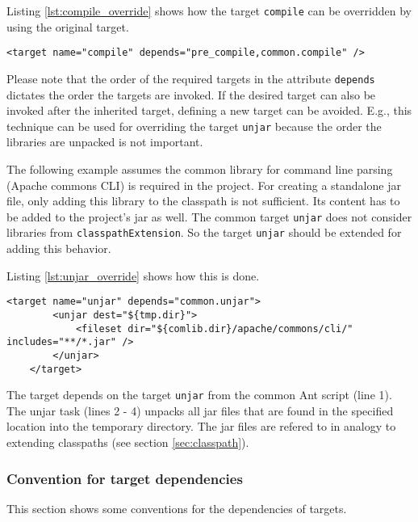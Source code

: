 \documentclass[a4paper,twoside,11pt,bibtotoc]{article}
\begin{document}
Listing \ref{lst:compile_override} shows how the target \texttt{compile} can be overridden by using the original target.

\begin{lstlisting}[caption=Overriding the target \texttt{compile},label=lst:compile_override,float=!ht,language=Ant]
	<target name="compile" depends="pre_compile,common.compile" />
\end{lstlisting}

Please note that the order of the required targets in the attribute \texttt{depends} dictates the order the targets are invoked.
If the desired target can also be invoked after the inherited target, defining a new target can be avoided.
E.g., this technique can be used for overriding the target \texttt{unjar} because the order the libraries are unpacked is not important.

The following example assumes the common library for command line parsing (Apache commons CLI) is required in the project.%
For creating a standalone jar file, only adding this library to the classpath is not sufficient.
Its content has to be added to the project's jar as well.
The common target \texttt{unjar} does not consider libraries from \texttt{classpathExtension}.
So the target \texttt{unjar} should be extended for adding this behavior.

Listing \ref{lst:unjar_override} shows how this is done.

\begin{lstlisting}[caption=Overriding the target \texttt{unjar},label=lst:unjar_override,float=!ht,language=Ant]
	<target name="unjar" depends="common.unjar">
		<unjar dest="${tmp.dir}">
			<fileset dir="${comlib.dir}/apache/commons/cli/" includes="**/*.jar" />
		</unjar>
	</target>
\end{lstlisting}

The target depends on the target \texttt{unjar} from the common Ant script (line 1).
The unjar task (lines 2 - 4) unpacks all jar files that are found in the specified location into the temporary directory.
The jar files are refered to in analogy to extending classpaths (see section \ref{sec:classpath}).

\subsubsection{Convention for target dependencies}
\label{sec:target:conventions}
This section shows some conventions for the dependencies of targets.
\end{document}
